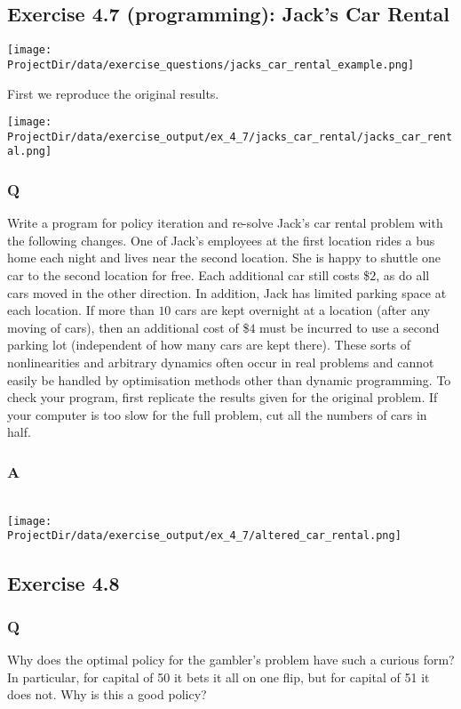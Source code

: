 \subsection{Exercise 4.7 (programming): Jack's Car Rental}

\texttt{[image: \\ProjectDir/data/exercise\_questions/jacks\_car\_rental\_example.png]}

First we reproduce the original results.

\texttt{[image: \\ProjectDir/data/exercise\_output/ex\_4\_7/jacks\_car\_rental/jacks\_car\_rental.png]}

\subsubsection*{Q}
Write a program for policy iteration and re-solve Jack’s car rental problem with the following changes. One of Jack’s employees at the first location rides a bus home each night and lives near the second location. She is happy to shuttle one car to the second location for free. Each additional car still costs \$$2$, as do all cars moved in the other direction. In addition, Jack has limited parking space at each location. If more than $10$ cars are kept overnight at a location (after any moving of cars), then an additional cost of \$$4$ must be incurred to use a second parking lot (independent of how many cars are kept there). These sorts of nonlinearities and arbitrary dynamics often occur in real problems and cannot easily be handled by optimisation methods other than dynamic programming. To check your program, first replicate the results given for the original problem. If your computer is too slow for the full problem, cut all the numbers of cars in half.

\subsubsection*{A}
\ProgrammingExercise\\
\texttt{[image: \\ProjectDir/data/exercise\_output/ex\_4\_7/altered\_car\_rental.png]}

\subsection{Exercise 4.8}
\subsubsection*{Q}
Why does the optimal policy for the gambler’s problem have such a curious form? In particular, for capital of 50 it bets it all on one flip, but for capital of 51 it does not. Why is this a good policy?

